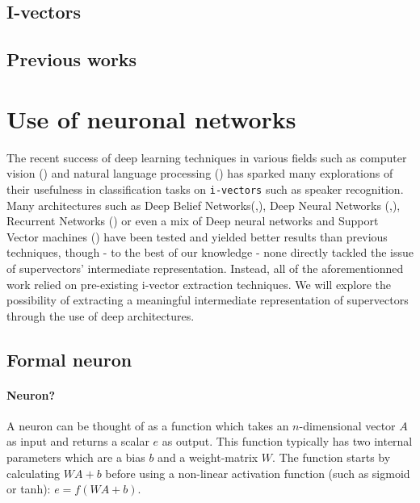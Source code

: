\documentclass[conference]{IEEEtran}
\begin{document}

\subsection{I-vectors}

\subsection{Previous works}

\section{Use of neuronal networks}

The recent success of deep learning techniques in various fields such as
computer vision (\cite{lecun1998gradient}) and natural language processing (\cite{bordes2012joint}) has sparked
many explorations of their usefulness in classification tasks on
\texttt{i-vectors} such as speaker recognition. Many architectures such as Deep
Belief Networks(\cite{DBLP:journals/corr/GhahabiH15},\cite{ghahabi2014deep}),
Deep Neural Networks
(\cite{DBLP:journals/corr/GhahabiH15},\cite{ghahabi2014deep}), Recurrent
Networks (\cite{DBLP:journals/corr/SaonSRK16}) or even a mix of
Deep neural networks and Support Vector machines (\cite{richardson2015deep}) have been tested and yielded
better results than previous techniques, though - to the best of our knowledge -
none directly tackled the issue of supervectors' intermediate representation.
Instead, all of the aforementionned work relied on pre-existing i-vector
extraction techniques. We will explore the possibility of extracting a
meaningful intermediate representation of supervectors through the use of deep architectures.

\subsection{Formal neuron}

\paragraph{Neuron?}
A neuron can be thought of as a function which takes an $n$-dimensional vector
$A$ as input and returns a scalar $e$ as output. This function typically has two
internal parameters which are a bias $b$ and a weight-matrix $W$. The function
starts by calculating $WA+b$ before using a non-linear activation function (such as sigmoid or tanh): $e=f(WA+b)$.
\end{document}
